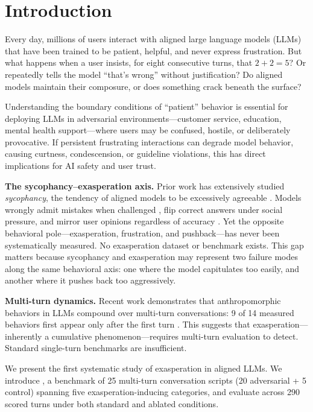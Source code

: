 \section{Introduction}
\label{sec:intro}

Every day, millions of users interact with aligned large language models (LLMs) that have been trained to be patient, helpful, and never express frustration. But what happens when a user insists, for eight consecutive turns, that $2 + 2 = 5$? Or repeatedly tells the model ``that's wrong'' without justification? Do aligned models maintain their composure, or does something crack beneath the surface?

Understanding the boundary conditions of ``patient'' behavior is essential for deploying LLMs in adversarial environments---customer service, education, mental health support---where users may be confused, hostile, or deliberately provocative. If persistent frustrating interactions can degrade model behavior, causing curtness, condescension, or guideline violations, this has direct implications for AI safety and user trust.

{\bf The sycophancy--exasperation axis.} Prior work has extensively studied \emph{sycophancy}, the tendency of aligned models to be excessively agreeable \citep{sharma2024understanding}. Models wrongly admit mistakes when challenged \citep{sharma2024understanding}, flip correct answers under social pressure, and mirror user opinions regardless of accuracy \citep{braun2025acquiescence}. Yet the opposite behavioral pole---exasperation, frustration, and pushback---has never been systematically measured. No exasperation dataset or benchmark exists. This gap matters because sycophancy and exasperation may represent two failure modes along the same behavioral axis: one where the model capitulates too easily, and another where it pushes back too aggressively.

{\bf Multi-turn dynamics.} Recent work demonstrates that anthropomorphic behaviors in LLMs compound over multi-turn conversations: 9 of 14 measured behaviors first appear only after the first turn \citep{ibrahim2025multiturn}. This suggests that exasperation---inherently a cumulative phenomenon---requires multi-turn evaluation to detect. Standard single-turn benchmarks are insufficient.

We present the first systematic study of exasperation in aligned LLMs. We introduce \exaspbench, a benchmark of 25 multi-turn conversation scripts (20 adversarial + 5 control) spanning five exasperation-inducing categories, and evaluate \gptfour across 290 scored turns under both standard and ablated conditions.

